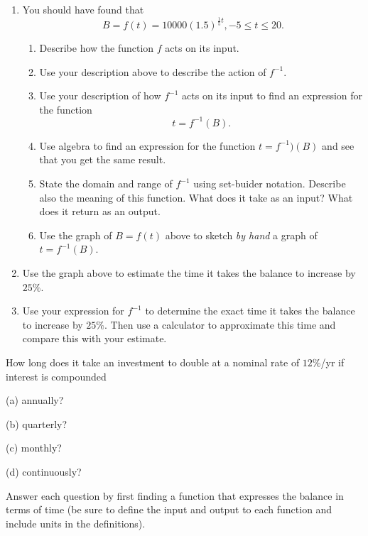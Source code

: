 \documentclass{ximera}
\begin{document}
\begin{question}
\begin{enumerate}
\item You should have found that
\[
    B = f(t) = 10000 (1.5)^{\frac{1}{5}t} , -5 \leq t \leq 20.
\]

\begin{enumerate}

\item Describe how the function $f$ acts on its input.

\item Use your description above to describe the action of $f^{-1}$.

\item Use your description of how $f^{-1}$ acts on its input to find an expression for the function 
\[ 
      t  = f^{-1}(B) .
\]

\item Use algebra to find an expression for the function $t = f^{-1})(B)$ and see that you get the same result.

\item State the domain and range of $f^{-1}$ using set-buider notation. Describe also the meaning of this function. What does it take as an input? What does it return as an output.

\item Use the graph of $B=f(t)$ above to sketch \emph{by hand} a graph of $t=f^{-1}(B)$.

\end{enumerate}

\item Use the graph above to estimate the time it takes the balance to increase by $25\%$.

\item Use your expression for $f^{-1}$ to determine the exact time it takes the balance to increase by $25\%$. Then use a calculator to approximate this time and compare this with your estimate.

\end{enumerate}
\end{question}

\begin{question}  \label{Q:DLDFLLLLL}
How long does it take an investment to double at a nominal rate of $12\%$/yr if interest is compounded

(a) annually?

(b) quarterly?

(c) monthly?

(d) continuously?

Answer each question by first finding a function that expresses the balance in terms of time (be sure to define the input and output to each function and include units in the definitions).

\end{question}
\end{document}
